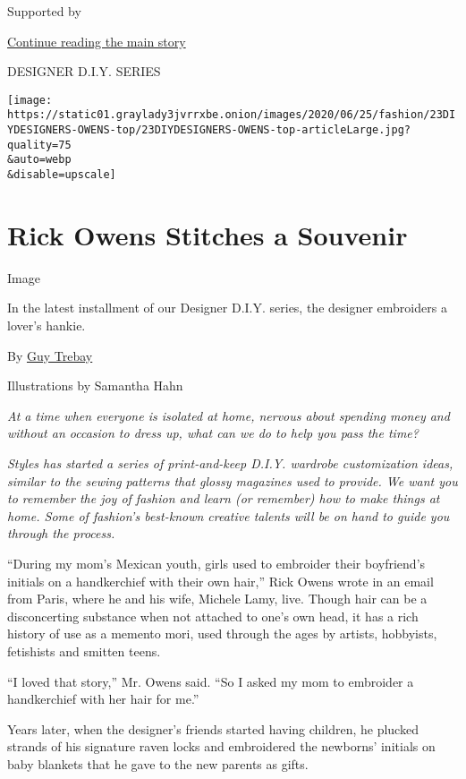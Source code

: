 Supported by

\protect\hyperlink{after-sponsor}{Continue reading the main story}

DESIGNER D.I.Y. SERIES

\texttt{[image: https://static01.graylady3jvrrxbe.onion/images/2020/06/25/fashion/23DIYDESIGNERS-OWENS-top/23DIYDESIGNERS-OWENS-top-articleLarge.jpg?quality=75\\\&auto=webp\\\&disable=upscale]}

\hypertarget{rick-owens-stitches-a-souvenir}{%
\section{Rick Owens Stitches a
Souvenir}\label{rick-owens-stitches-a-souvenir}}

Image

In the latest installment of our Designer D.I.Y. series, the designer
embroiders a lover's hankie.

By \href{https://www.nytimes3xbfgragh.onion/by/guy-trebay}{Guy Trebay}

Illustrations by Samantha Hahn

\emph{At a time when everyone is isolated at home, nervous about
spending money and without an occasion to dress up, what can we do to
help you pass the time?}

\emph{Styles has started a series of print-and-keep D.I.Y. wardrobe
customization ideas, similar to the sewing patterns that glossy
magazines used to provide. We want you to remember the joy of fashion
and learn (or remember) how to make things at home. Some of fashion's
best-known creative talents will be on hand to guide you through the
process.}

``During my mom's Mexican youth, girls used to embroider their
boyfriend's initials on a handkerchief with their own hair,'' Rick Owens
wrote in an email from Paris, where he and his wife, Michele Lamy, live.
Though hair can be a disconcerting substance when not attached to one's
own head, it has a rich history of use as a memento mori, used through
the ages by artists, hobbyists, fetishists and smitten teens.

``I loved that story,'' Mr. Owens said. ``So I asked my mom to embroider
a handkerchief with her hair for me.''

Years later, when the designer's friends started having children, he
plucked strands of his signature raven locks and embroidered the
newborns' initials on baby blankets that he gave to the new parents as
gifts.

